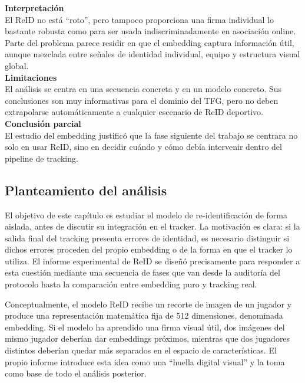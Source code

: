 \documentclass[../MAIN.tex]{subfiles}
\begin{document}
\begin{chaptertemplatebox}
		\textbf{Interpretación}\\
		El ReID no está ``roto'', pero tampoco proporciona una firma individual lo bastante robusta como para ser usada indiscriminadamente en asociación online. Parte del problema parece residir en que el embedding captura información útil, aunque mezclada entre señales de identidad individual, equipo y estructura visual global.\\[0.5em]
		
		\textbf{Limitaciones}\\
		El análisis se centra en una secuencia concreta y en un modelo concreto. Sus conclusiones son muy informativas para el dominio del TFG, pero no deben extrapolarse automáticamente a cualquier escenario de ReID deportivo.\\[0.5em]
		
		\textbf{Conclusión parcial}\\
		El estudio del embedding justificó que la fase siguiente del trabajo se centrara no solo en usar ReID, sino en decidir cuándo y cómo debía intervenir dentro del pipeline de tracking.
	\end{chaptertemplatebox}
	
	\subsection{Planteamiento del análisis}
	
	El objetivo de este capítulo es estudiar el modelo de re-identificación de forma aislada, antes de discutir su integración en el tracker. La motivación es clara: si la salida final del tracking presenta errores de identidad, es necesario distinguir si dichos errores proceden del propio embedding o de la forma en que el tracker lo utiliza. El informe experimental de ReID se diseñó precisamente para responder a esta cuestión mediante una secuencia de fases que van desde la auditoría del protocolo hasta la comparación entre embedding puro y tracking real.
	
	Conceptualmente, el modelo ReID recibe un recorte de imagen de un jugador y produce una representación matemática fija de 512 dimensiones, denominada embedding. Si el modelo ha aprendido una firma visual útil, dos imágenes del mismo jugador deberían dar embeddings próximos, mientras que dos jugadores distintos deberían quedar más separados en el espacio de características. El propio informe introduce esta idea como una “huella digital visual” y la toma como base de todo el análisis posterior.
	
\end{document}
